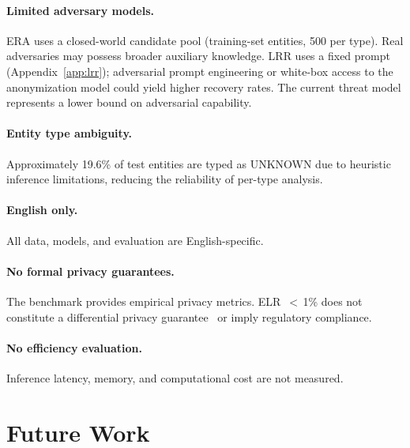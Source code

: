 \documentclass[10pt,twocolumn]{article}
\begin{document}
\paragraph{Limited adversary models.}
ERA uses a closed-world candidate pool (training-set entities, 500 per type).
Real adversaries may possess broader auxiliary knowledge.
LRR uses a fixed prompt (Appendix~\ref{app:lrr}); adversarial prompt engineering or white-box access to the anonymization model could yield higher recovery rates.
The current threat model represents a lower bound on adversarial capability.

\paragraph{Entity type ambiguity.}
Approximately 19.6\% of test entities are typed as UNKNOWN due to heuristic inference limitations, reducing the reliability of per-type analysis.

\paragraph{English only.}
All data, models, and evaluation are English-specific.

\paragraph{No formal privacy guarantees.}
The benchmark provides empirical privacy metrics.
ELR~$<$\,1\% does not constitute a differential privacy guarantee~\citep{dwork2006} or imply regulatory compliance.

\paragraph{No efficiency evaluation.}
Inference latency, memory, and computational cost are not measured.

\section{Future Work}\label{sec:future}
\end{document}
